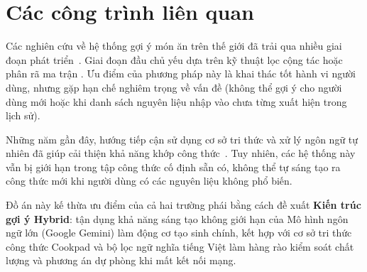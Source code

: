 \section{Các công trình liên quan}

Các nghiên cứu về hệ thống gợi ý món ăn  trên thế giới đã trải qua nhiều giai đoạn phát triển~\cite{Trattner2017}. Giai đoạn đầu chủ yếu dựa trên kỹ thuật lọc cộng tác  hoặc phân rã ma trận . Ưu điểm của phương pháp này là khai thác tốt hành vi người dùng, nhưng gặp hạn chế nghiêm trọng về vấn đề  (không thể gợi ý cho người dùng mới hoặc khi danh sách nguyên liệu nhập vào chưa từng xuất hiện trong lịch sử).

Những năm gần đây, hướng tiếp cận sử dụng cơ sở tri thức  và xử lý ngôn ngữ tự nhiên đã giúp cải thiện khả năng khớp công thức~\cite{Nguyen2020}. Tuy nhiên, các hệ thống này vẫn bị giới hạn trong tập công thức cố định sẵn có, không thể tự sáng tạo ra công thức mới khi người dùng có các nguyên liệu không phổ biến.

Đồ án này kế thừa ưu điểm của cả hai trường phái bằng cách đề xuất \textbf{Kiến trúc gợi ý Hybrid}: tận dụng khả năng sáng tạo không giới hạn của Mô hình ngôn ngữ lớn (Google Gemini) làm động cơ tạo sinh chính, kết hợp với cơ sở tri thức công thức Cookpad và bộ lọc ngữ nghĩa tiếng Việt làm hàng rào kiểm soát chất lượng và phương án dự phòng khi mất kết nối mạng.
